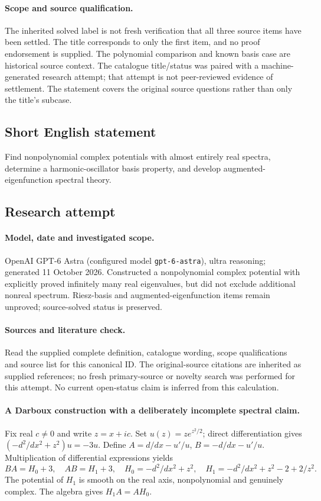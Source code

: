 \documentclass[11pt]{article}
\begin{document}
\paragraph{Scope and source qualification.}The inherited solved label is not fresh verification that all three source items have been settled. The title corresponds to only the first item, and no proof endorsement is supplied. The polynomial comparison and known basis case are historical source context. The catalogue title/status was paired with a machine-generated research attempt; that attempt is not peer-reviewed evidence of settlement. The statement covers the original source questions rather than only the title’s subcase.
\subsection{Short English statement}
Find nonpolynomial complex potentials with almost entirely real spectra, determine a harmonic-oscillator basis property, and develop augmented-eigenfunction spectral theory.
\subsection{Research attempt}
\paragraph{Model, date and investigated scope.}
OpenAI GPT-6 Astra (configured model \texttt{gpt-6-astra}), ultra reasoning; generated 11 October 2026. Constructed a nonpolynomial complex potential with explicitly proved infinitely many real eigenvalues, but did not exclude additional nonreal spectrum. Riesz-basis and augmented-eigenfunction items remain unproved; source-solved status is preserved.

\paragraph{Sources and literature check.}
Read the supplied complete definition, catalogue wording, scope qualifications and source list for this canonical ID. The original-source citations are inherited as supplied references; no fresh primary-source or novelty search was performed for this attempt. No current open-status claim is inferred from this calculation.

\paragraph{A Darboux construction with a deliberately incomplete spectral claim.}Fix real \(c\ne0\) and write \(z=x+ic\). Set \(u(z)=ze^{z^2/2}\); direct differentiation gives \((-d^2/dx^2+z^2)u=-3u\). Define \(A=d/dx-u'/u\), \(B=-d/dx-u'/u\). Multiplication of differential expressions yields
\[BA=H_0+3,\quad AB=H_1+3,\quad
H_0=-d^2/dx^2+z^2,\quad H_1=-d^2/dx^2+z^2-2+2/z^2.
\]
The potential of \(H_1\) is smooth on the real axis, nonpolynomial and genuinely complex. The algebra gives \(H_1A=AH_0\).
\end{document}
